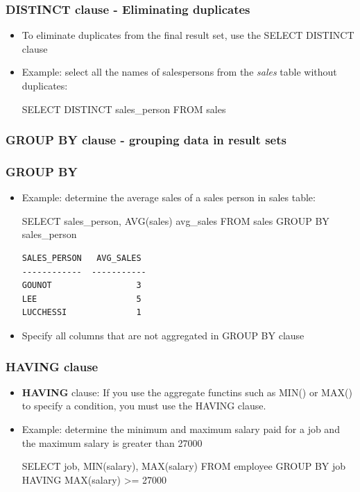 \documentclass{article}
\begin{document}
\subsubsection{DISTINCT clause - Eliminating duplicates}
\begin{itemize}
\item To eliminate duplicates from the final result set, use the SELECT DISTINCT clause
\item Example: select all the names of salespersons from the \textit{sales} table without duplicates:
\begin{sqlcode}
SELECT DISTINCT sales_person FROM sales
\end{sqlcode}
\end{itemize}

\subsubsection{GROUP BY clause - grouping data in result sets}
\subsubsection*{GROUP BY}
\begin{itemize}
\item Example: determine the average sales of a sales person in sales table:
\begin{sqlcode}
SELECT sales_person, AVG(sales) avg_sales FROM sales GROUP BY sales_person
\end{sqlcode}
\begin{verbatim}
SALES_PERSON   AVG_SALES
------------  -----------
GOUNOT                 3
LEE                    5 
LUCCHESSI              1
\end{verbatim}
\item Specify all columns that are not aggregated in GROUP BY clause
\end{itemize}
\subsubsection*{HAVING clause}
\begin{itemize}
\item \textbf{HAVING} clause: If you use the aggregate functins such as MIN() or MAX() to specify 
a condition, you must use the HAVING clause.
\item Example: determine the minimum and maximum salary paid for a job and the maximum salary is greater
than 27000
\begin{sqlcode}
SELECT job, MIN(salary), MAX(salary)
FROM employee
GROUP BY job
HAVING MAX(salary) >= 27000
\end{sqlcode}
\end{itemize}
\end{document}
